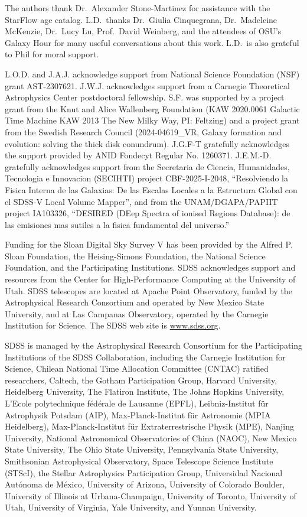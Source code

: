 \documentclass[twocolumn,twocolappendix]{aastex701}
\begin{document}
The authors thank Dr.\ Alexander Stone-Martinez for assistance with the StarFlow age catalog. L.D.\ thanks Dr.\ Giulia Cinquegrana, Dr.\ Madeleine McKenzie, Dr.\ Lucy Lu, Prof.\ David Weinberg, and the attendees of OSU's Galaxy Hour for many useful conversations about this work. L.D.\ is also grateful to Phil for moral support.

L.O.D. and J.A.J. acknowledge support from National Science Foundation (NSF) grant AST-2307621. 
J.W.J. acknowledges support from a Carnegie Theoretical Astrophysics Center postdoctoral fellowship.
S.F. was supported by a project grant from the Knut and Alice Wallenberg Foundation (KAW 2020.0061 Galactic Time Machine  KAW 2013 The New Milky Way, PI: Feltzing) and a project grant from the Swedish Research Council (2024-04619\_VR, Galaxy formation and evolution: solving the thick disk conundrum).
J.G.F-T gratefully acknowledges the support provided by ANID Fondecyt Regular No. 1260371.
J.E.M.-D. gratefully acknowledges support from the Secretaria de Ciencia, Humanidades, Tecnologia e Innovacion (SECIHTI) project CBF-2025-I-2048, ``Resolviendo la Fisica Interna de las Galaxias: De las Escalas Locales a la Estructura Global con el SDSS-V Local Volume Mapper'', and from the UNAM/DGAPA/PAPIIT project IA103326, ``DESIRED (DEep Spectra of ionised Regions Database): de las emisiones mas sutiles a la fisica fundamental del universo.''

Funding for the Sloan Digital Sky Survey V has been provided by the Alfred P. Sloan Foundation, the Heising-Simons Foundation, the National Science Foundation, and the Participating Institutions. SDSS acknowledges support and resources from the Center for High-Performance Computing at the University of Utah. SDSS telescopes are located at Apache Point Observatory, funded by the Astrophysical Research Consortium and operated by New Mexico State University, and at Las Campanas Observatory, operated by the Carnegie Institution for Science. The SDSS web site is \url{www.sdss.org}.

SDSS is managed by the Astrophysical Research Consortium for the Participating Institutions of the SDSS Collaboration, including the Carnegie Institution for Science, Chilean National Time Allocation Committee (CNTAC) ratified researchers, Caltech, the Gotham Participation Group, Harvard University, Heidelberg University, The Flatiron Institute, The Johns Hopkins University, L'Ecole polytechnique f\'{e}d\'{e}rale de Lausanne (EPFL), Leibniz-Institut f\"{u}r Astrophysik Potsdam (AIP), Max-Planck-Institut f\"{u}r Astronomie (MPIA Heidelberg), Max-Planck-Institut f\"{u}r Extraterrestrische Physik (MPE), Nanjing University, National Astronomical Observatories of China (NAOC), New Mexico State University, The Ohio State University, Pennsylvania State University, Smithsonian Astrophysical Observatory, Space Telescope Science Institute (STScI), the Stellar Astrophysics Participation Group, Universidad Nacional Aut\'{o}noma de M\'{e}xico, University of Arizona, University of Colorado Boulder, University of Illinois at Urbana-Champaign, University of Toronto, University of Utah, University of Virginia, Yale University, and Yunnan University.
\end{document}
